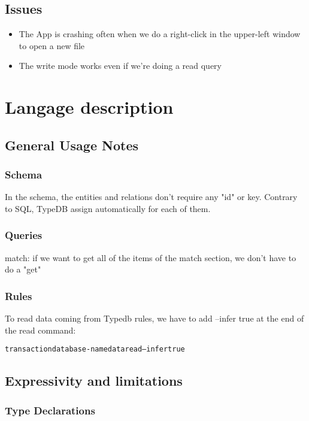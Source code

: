 \documentclass{article}
\begin{document}
\subsection{Issues}


\begin{itemize}
\item The App is crashing often when we do a right-click in the upper-left window to open a new file
\item The write mode works even if we're doing a read query
\end{itemize}

\section{Langage description}

\subsection{General Usage Notes}


\subsubsection{Schema}
In the schema, the entities and relations don't require any "id" or key. Contrary to SQL, TypeDB assign automatically for each of them.

\subsubsection{Queries}
match: if we want to get all of the items of the match section, we don't have to do a "get"

\subsubsection{Rules}

To read data coming from Typedb rules, we have to add --infer true at the end of the read command: 
\begin{alltt}
transaction database-name data read --infer true
\end{alltt}


\subsection{Expressivity and limitations}

\subsubsection{Type Declarations}
\end{document}
